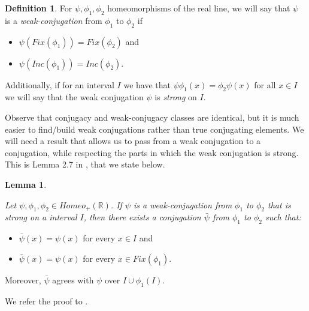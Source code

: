 \documentclass[12pt]{article}
\newcommand{\R}{\mathbb{R}}
\theoremstyle{definition}
\newtheorem{lem}[thm]{Lemma}
\newtheorem{defi}[thm]{Definition}
\begin{document}
\begin{defi}\label{weakdefi} For $\psi,\phi_1, \phi_2$ homeomorphisms of the real line, we will say that $\psi$ is a {\em weak-conjugation} from $\phi_1$ to $\phi_2$ if \begin{itemize}
\item  $\psi(Fix(\phi_1))=Fix(\phi_2)$ and
\item $\psi(Inc(\phi_1))=Inc(\phi_2)$. \end{itemize}
Additionally, if for an interval $I$ we have that $\psi\phi_1(x)=\phi_2\psi(x)$ for all $x\in I$ we will say that the weak conjugation $\psi$ is {\em strong} on $I$.
\end{defi}

Observe that conjugacy and weak-conjugacy classes are identical, but it is much easier to find/build weak conjugations rather than true conjugating elements. We will need a result that allows us to pass from a weak conjugation to a conjugation, while respecting the parts in which the weak conjugation is strong. This is Lemma 2.7 in \cite{abr}, that we state below. 




\begin{lem}\label{promotion} {\em Let $\psi,\phi_1,\phi_2\in Homeo_+(\R)$. If $\psi$ is a weak-conjugation from $\phi_1$ to $\phi_2$ that is strong on a interval $I$, then there exists a conjugation $\bar{\psi}$ from $\phi_1$ to $\phi_2$ such that:
\begin{itemize}
\item $\bar{\psi}(x)=\psi(x)$ for every $x\in I$ and
\item $\bar{\psi}(x)=\psi(x)$ for every $x\in Fix(\phi_1)$.
\end{itemize}
Moreover, $\bar \psi$ agrees with $\psi$ over $I\cup \phi_1(I)$.}

\end{lem}

We refer the proof to \cite{abr}.
\end{document}
